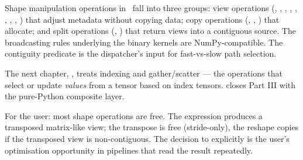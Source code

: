 Shape manipulation operations in \Lucid\ fall into three groups:
view operations (, , ,
, , , ,
, ) that adjust metadata without copying
data; copy operations (, , )
that allocate; and split operations (, )
that return views into a contiguous source. The broadcasting rules
underlying the binary kernels are NumPy-compatible. The contiguity
predicate is the dispatcher's input for fast-vs-slow path
selection.

The next chapter, , treats indexing and
gather/scatter --- the operations that select or update
\emph{values} from a tensor based on index tensors.
 closes Part III with the pure-Python
composite layer.

\begin{lucidnote}
For the user: most shape operations are free. The expression
 produces a transposed
matrix-like view; the transpose is free (stride-only), the reshape
copies if the transposed view is non-contiguous. The decision to
 explicitly is the user's optimisation
opportunity in pipelines that read the result repeatedly.
\end{lucidnote}
